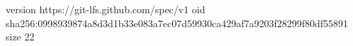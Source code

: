 version https://git-lfs.github.com/spec/v1
oid sha256:0998939874a8d3d1b33e083a7ec07d59930ca429af7a9203f28299f80df55891
size 22
